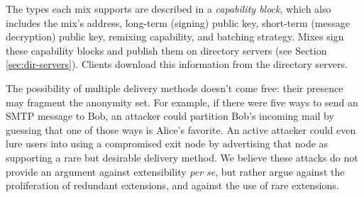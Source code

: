 \documentclass[times,10pt,twocolumn]{article}
\begin{document}
%
%

The types each mix supports are described in a \emph{capability block},
which also includes the mix's address, long-term (signing) public key,
short-term (message decryption) public key, remixing capability,
and batching strategy. Mixes sign these capability blocks
and publish them on directory servers (see Section \ref{sec:dir-servers}).
Clients download this information from the directory servers.

%

The possibility of multiple delivery methods doesn't come free: their
presence may fragment the anonymity set.  For example, if there were five
ways to send an SMTP message to Bob, an attacker could partition Bob's
incoming mail by guessing that one of those ways is Alice's favorite.
An active attacker could even lure users into using a compromised
exit node by advertising that node as supporting a
rare but desirable delivery method.
We believe these attacks do not provide an argument against
extensibility \emph{per se}, but rather argue against the proliferation
of redundant extensions, and against the use of rare extensions.  
\end{document}
